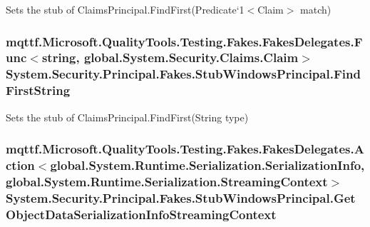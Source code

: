 Sets the stub of Claims\-Principal.\-Find\-First(Predicate`1$<$Claim$>$ match)

\hypertarget{class_system_1_1_security_1_1_principal_1_1_fakes_1_1_stub_windows_principal_a6fb9ffc64db7fa3b432c9bf13b21327b}{
\subsubsection[{Find\-First\-String}]{\setlength{\rightskip}{0pt plus 5cm}mqttf.\-Microsoft.\-Quality\-Tools.\-Testing.\-Fakes.\-Fakes\-Delegates.\-Func$<$string, global.\-System.\-Security.\-Claims.\-Claim$>$ System.\-Security.\-Principal.\-Fakes.\-Stub\-Windows\-Principal.\-Find\-First\-String}}\label{class_system_1_1_security_1_1_principal_1_1_fakes_1_1_stub_windows_principal_a6fb9ffc64db7fa3b432c9bf13b21327b}


Sets the stub of Claims\-Principal.\-Find\-First(\-String type)

\hypertarget{class_system_1_1_security_1_1_principal_1_1_fakes_1_1_stub_windows_principal_a41f4868fce6ab2149125e448b9966e1d}{
\subsubsection[{Get\-Object\-Data\-Serialization\-Info\-Streaming\-Context}]{\setlength{\rightskip}{0pt plus 5cm}mqttf.\-Microsoft.\-Quality\-Tools.\-Testing.\-Fakes.\-Fakes\-Delegates.\-Action$<$global.\-System.\-Runtime.\-Serialization.\-Serialization\-Info, global.\-System.\-Runtime.\-Serialization.\-Streaming\-Context$>$ System.\-Security.\-Principal.\-Fakes.\-Stub\-Windows\-Principal.\-Get\-Object\-Data\-Serialization\-Info\-Streaming\-Context}}\label{class_system_1_1_security_1_1_principal_1_1_fakes_1_1_stub_windows_principal_a41f4868fce6ab2149125e448b9966e1d}



